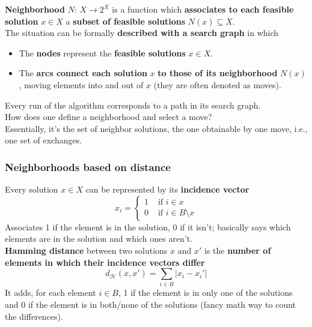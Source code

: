 \textbf{Neighborhood} $N : \, X \rightarrow 2^X$ is a function which \textbf{associates to each feasible solution} $x \in X$ a \textbf{subset of feasible solutions} $N (x) \subseteq X$.\\

The situation can be formally \textbf{described with a search graph} in which
\begin{itemize}
	\item The \textbf{nodes} represent the \textbf{feasible solutions} $x \in X$.\\
	
	\item The \textbf{arcs connect each solution} $x$ \textbf{to those of its neighborhood} $N (x)$, moving elements into and out of $x$ (they are often denoted as moves).\\
\end{itemize}

Every run of the algorithm corresponds to a path in its search graph.\\

How does one define a neighborhood and select a move? \\

Essentially, it's the set of neighbor solutions, the one obtainable by one move, i.e., one set of exchanges.\\

\newpage

\subsubsection{Neighborhoods based on distance}

Every solution $x \in X$ can be represented by its \textbf{incidence vector}
$$ x_i = \begin{cases}
	1 & \text{ if } i \in x \\
	0 & \text{ if } i \in B \setminus x
\end{cases}$$
Associates 1 if the element is in the solution, 0 if it isn't; basically says which elements are in the solution and which ones aren't.\\

\textbf{Hamming distance} between two solutions $x$ and $x'$  is the \textbf{number of elements in which their incidence vectors differ}
$$ d_{\mathcal{H}} (x, x') = \sum_{i \in B} |x_i - x_i'|$$
It adds, for each element $i \in B$, 1 if the element is in only one of the solutions and 0 if the element is in both/none of the solutions (fancy math way to count the differences).\\

